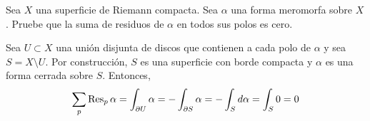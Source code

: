 \begin{exercise}
Sea $X$ una superficie de Riemann compacta. Sea $\alpha$ una forma meromorfa sobre $X$. Pruebe
que la suma de residuos de $\alpha$ en todos sus polos es cero.
\end{exercise}

\begin{solution}
Sea $U \subset X$ una unión disjunta de discos que contienen a cada polo de $\alpha$ y sea $S = X \setminus U$. Por construcción, $S$ es una superficie con borde compacta y $\alpha$ es una forma cerrada sobre $S$. Entonces,
$$\sum_p \operatorname{Res}_p \alpha = \int_{\partial U} \alpha = -\int_{\partial S} \alpha = -\int_S d\alpha = \int_S 0 = 0$$
\end{solution}
